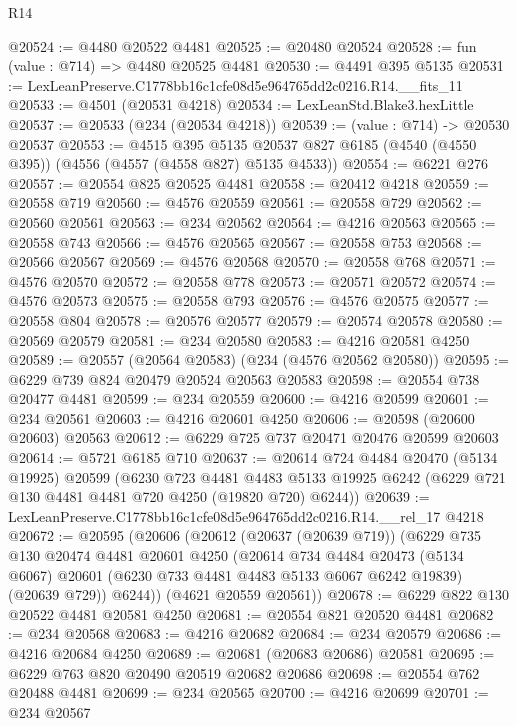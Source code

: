 \begin{lexlean}{R14}
\begin{coremodule}
@20524 := @4480 @20522 @4481
@20525 := @20480 @20524
@20528 := fun (value : @714) => @4480 @20525 @4481
@20530 := @4491 @395 @5135
@20531 := LexLeanPreserve.C1778bb16c1cfe08d5e964765dd2c0216.R14.__fits_11
@20533 := @4501 (@20531 @4218)
@20534 := LexLeanStd.Blake3.hexLittle
@20537 := @20533 (@234 (@20534 @4218))
@20539 := (value : @714) -> @20530 @20537
@20553 := @4515
    @395
    @5135
    @20537
    @827
    @6185
    (@4540 (@4550 @395))
    (@4556 (@4557 (@4558 @827) @5135 @4533))
@20554 := @6221 @276
@20557 := @20554 @825 @20525 @4481
@20558 := @20412 @4218
@20559 := @20558 @719
@20560 := @4576 @20559
@20561 := @20558 @729
@20562 := @20560 @20561
@20563 := @234 @20562
@20564 := @4216 @20563
@20565 := @20558 @743
@20566 := @4576 @20565
@20567 := @20558 @753
@20568 := @20566 @20567
@20569 := @4576 @20568
@20570 := @20558 @768
@20571 := @4576 @20570
@20572 := @20558 @778
@20573 := @20571 @20572
@20574 := @4576 @20573
@20575 := @20558 @793
@20576 := @4576 @20575
@20577 := @20558 @804
@20578 := @20576 @20577
@20579 := @20574 @20578
@20580 := @20569 @20579
@20581 := @234 @20580
@20583 := @4216 @20581 @4250
@20589 := @20557 (@20564 @20583) (@234 (@4576 @20562 @20580))
@20595 := @6229 @739 @824 @20479 @20524 @20563 @20583
@20598 := @20554 @738 @20477 @4481
@20599 := @234 @20559
@20600 := @4216 @20599
@20601 := @234 @20561
@20603 := @4216 @20601 @4250
@20606 := @20598 (@20600 @20603) @20563
@20612 := @6229 @725 @737 @20471 @20476 @20599 @20603
@20614 := @5721 @6185 @710
@20637 := @20614
    @724
    @4484
    @20470
    (@5134 @19925)
    @20599
    (@6230
      @723
      @4481
      @4483
      @5133
      @19925
      @6242
      (@6229 @721 @130 @4481 @4481 @720 @4250 (@19820 @720) @6244))
@20639 := LexLeanPreserve.C1778bb16c1cfe08d5e964765dd2c0216.R14.__rel_17 @4218
@20672 := @20595
    (@20606
      (@20612
        (@20637 (@20639 @719))
        (@6229
          @735
          @130
          @20474
          @4481
          @20601
          @4250
          (@20614
            @734
            @4484
            @20473
            (@5134 @6067)
            @20601
            (@6230 @733 @4481 @4483 @5133 @6067 @6242 @19839)
            (@20639 @729))
          @6244))
      (@4621 @20559 @20561))
@20678 := @6229 @822 @130 @20522 @4481 @20581 @4250
@20681 := @20554 @821 @20520 @4481
@20682 := @234 @20568
@20683 := @4216 @20682
@20684 := @234 @20579
@20686 := @4216 @20684 @4250
@20689 := @20681 (@20683 @20686) @20581
@20695 := @6229 @763 @820 @20490 @20519 @20682 @20686
@20698 := @20554 @762 @20488 @4481
@20699 := @234 @20565
@20700 := @4216 @20699
@20701 := @234 @20567

\end{coremodule}
\end{lexlean}
